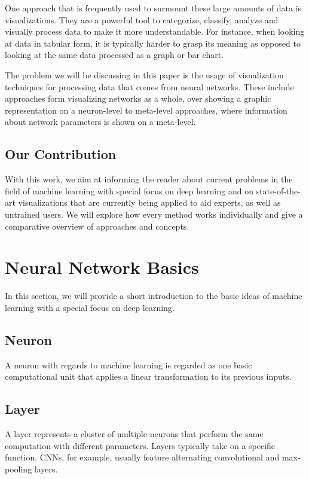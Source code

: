 \documentclass{acmsiggraph}               %
\begin{document}
One approach that is frequently used to surmount these large amounts of data is visualizations. They are a powerful tool to categorize, classify, analyze and visually process data to make it more understandable. For instance, when looking at data in tabular form, it is typically harder to grasp its meaning as opposed to looking at the same data processed as a graph or bar chart.

The problem we will be discussing in this paper is the usage of visualization techniques for processing data that comes from neural networks. These include approaches form visualizing networks as a whole, over showing a graphic representation on a neuron-level to meta-level approaches, where information about network parameters is shown on a meta-level.

\subsection{Our Contribution}
With this work, we aim at informing the reader about current problems in the field of machine learning with special focus on deep learning and on state-of-the-art visualizations that are currently being applied to aid experts, as well as untrained users. We will explore how every method works individually and give a comparative overview of approaches and concepts.

\section{Neural Network Basics}
In this section, we will provide a short introduction to the basic ideas of machine learning with a special focus on deep learning.

\subsection{Neuron}
A neuron with regards to machine learning is regarded as one basic computational unit that applies a linear transformation to its previous inputs.

\subsection{Layer}
A layer represents a cluster of multiple neurons that perform the same computation with different parameters. Layers typically take on a specific function. CNNs, for example, usually feature alternating convolutional and max-pooling layers. 
\end{document}
